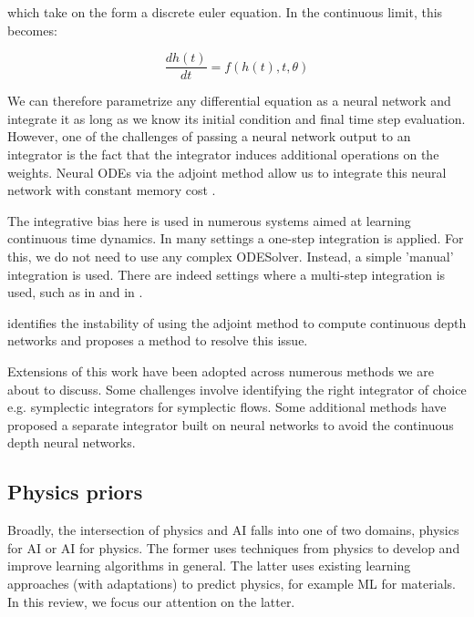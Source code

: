 \documentclass{article}
\begin{document}
which take on the form a discrete euler equation. In the continuous limit, this becomes:

$$ \frac{dh(t)}{dt} = f(h(t),t,\theta) $$

We can therefore parametrize any differential equation as a neural network and integrate it as long as we know its initial condition and final time step evaluation. However, one of the challenges of passing a neural network output to an integrator is the fact that the integrator induces additional operations on the weights. Neural ODEs via the adjoint method allow us to integrate this neural network with constant memory cost \cite{chen_neural_2018}.

The integrative bias here is used in numerous systems aimed at learning continuous time dynamics. In many settings a one-step integration is applied. For this, we do not need to use any complex ODESolver. Instead, a simple 'manual' integration is used. There are indeed settings where a multi-step integration is used, such as in \cite{zhong_symplectic_2019} and in \cite{saemundsson_variational_2019}.

\cite{dupont_augmented_2019} identifies the instability of using the adjoint method to compute continuous depth networks and proposes a method to resolve this issue. 

Extensions of this work have been adopted across numerous methods we are about to discuss. Some challenges involve identifying the right integrator of choice e.g. symplectic integrators for symplectic flows. Some additional methods have proposed a separate integrator built on neural networks to avoid the continuous depth neural networks.

\subsection{Physics priors}

Broadly, the intersection of physics and AI falls into one of two domains, physics for AI or AI for physics. The former uses techniques from physics to develop and improve learning algorithms in general. The latter uses existing learning approaches (with adaptations) to predict physics, for example ML for materials. In this review, we focus our attention on the latter.
\end{document}
